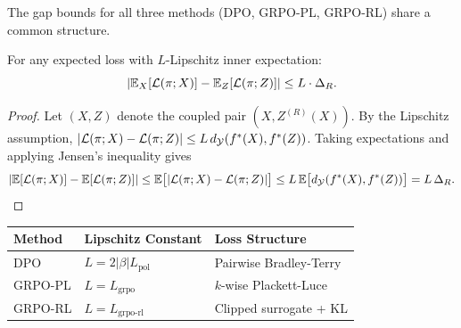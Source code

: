 The gap bounds for all three methods (DPO, GRPO-PL, GRPO-RL) share a common structure.

\begin{theorem}\label{thm:unified}
For any expected loss with $L$-Lipschitz inner expectation:
\[
|\mathbb{E}_X[\mathcal{L}(\pi; X)] - \mathbb{E}_Z[\mathcal{L}(\pi; Z)]| \le L \cdot \Delta_R.
\]
\end{theorem}

\begin{proof}
Let $(X,Z)$ denote the coupled pair $(X,Z^{(R)}(X))$. By the Lipschitz assumption,
$|\mathcal{L}(\pi;X)-\mathcal{L}(\pi;Z)|\le L\,d_{\mathcal{Y}}(f^{\ast}(X),f^{\ast}(Z))$. Taking expectations and applying Jensen's inequality gives
\[
|\mathbb{E}[\mathcal{L}(\pi;X)]-\mathbb{E}[\mathcal{L}(\pi;Z)]|
\le \mathbb{E}\big[|\mathcal{L}(\pi;X)-\mathcal{L}(\pi;Z)|\big]
\le L\,\mathbb{E}\big[d_{\mathcal{Y}}(f^{\ast}(X),f^{\ast}(Z))\big]
= L\,\Delta_R.
\]
\end{proof}

\begin{center}
\begin{tabular}{lll}
\toprule
\textbf{Method} & \textbf{Lipschitz Constant} & \textbf{Loss Structure} \\
\midrule
DPO & $L = 2|\beta| L_{\text{pol}}$ & Pairwise Bradley-Terry \\
GRPO-PL & $L = L_{\text{grpo}}$ & $k$-wise Plackett-Luce \\
GRPO-RL & $L = L_{\text{grpo-rl}}$ & Clipped surrogate + KL \\
\bottomrule
\end{tabular}
\end{center}
